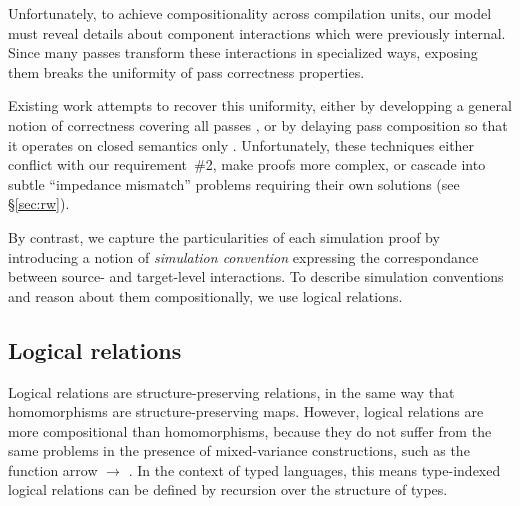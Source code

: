 \documentclass[acmsmall,authordraft]{acmart}
\begin{document}
Unfortunately,
to achieve compositionality across compilation units,
our model must reveal details
about component interactions
which were previously internal.
Since many passes transform
these interactions in
specialized ways,
exposing them breaks the uniformity
of pass correctness properties.

Existing work attempts to recover this uniformity,
either by developping a general notion of correctness
covering all passes
\cite{compcompcert,compcertm},
or by delaying pass composition so that
it operates on closed semantics only
\cite{sepcompcert,compcertm}.
Unfortunately, these techniques either
conflict with our requirement~\#2,
make proofs more complex,
or cascade into subtle ``impedance mismatch'' problems
requiring their own solutions (see \S\ref{sec:rw}).

By contrast,
we capture the particularities of each simulation proof
by introducing a notion of \emph{simulation convention}
expressing the correspondance between
source- and target-level interactions.
To describe simulation conventions
and reason about them
compositionally,
we use logical relations.



\subsection{Logical relations} \label{sec:logrel} %

Logical relations are structure-preserving relations,
in the same way that homomorphisms are structure-preserving maps.
However,
logical relations are more compositional than homomorphisms,
because they do not suffer from the same problems
in the presence of mixed-variance constructions,
such as the function arrow $\rightarrow$ \cite{lrp}.
In the context of typed languages,
this means type-indexed logical relations
can be defined by recursion over the structure of types.

\end{document}
